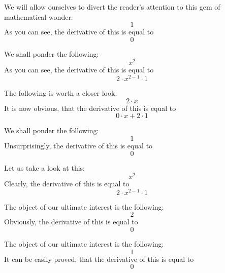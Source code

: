 \documentclass{article}
\begin{document}
We will allow ourselves to divert the reader's attention to this gem of mathematical wonder:
\begin{equation}
1 
\end{equation}
As you can see, the derivative of this is equal to
\begin{equation}
0 
\end{equation}

We shall ponder the following:
\begin{equation}
x ^{2 } 
\end{equation}
As you can see, the derivative of this is equal to
\begin{equation}
2 \cdot x ^{2 - 1 } \cdot 1 
\end{equation}

The following is worth a closer look:
\begin{equation}
2 \cdot x 
\end{equation}
It is now obvious, that the derivative of this is equal to
\begin{equation}
0 \cdot x + 2 \cdot 1 
\end{equation}

We shall ponder the following:
\begin{equation}
1 
\end{equation}
Unsurprisingly, the derivative of this is equal to
\begin{equation}
0 
\end{equation}

Let us take a look at this:
\begin{equation}
x ^{2 } 
\end{equation}
Clearly, the derivative of this is equal to
\begin{equation}
2 \cdot x ^{2 - 1 } \cdot 1 
\end{equation}

The object of our ultimate interest is the following:
\begin{equation}
2 
\end{equation}
Obviously, the derivative of this is equal to
\begin{equation}
0 
\end{equation}

The object of our ultimate interest is the following:
\begin{equation}
1 
\end{equation}
It can be easily proved, that the derivative of this is equal to
\begin{equation}
0 
\end{equation}
\end{document}
